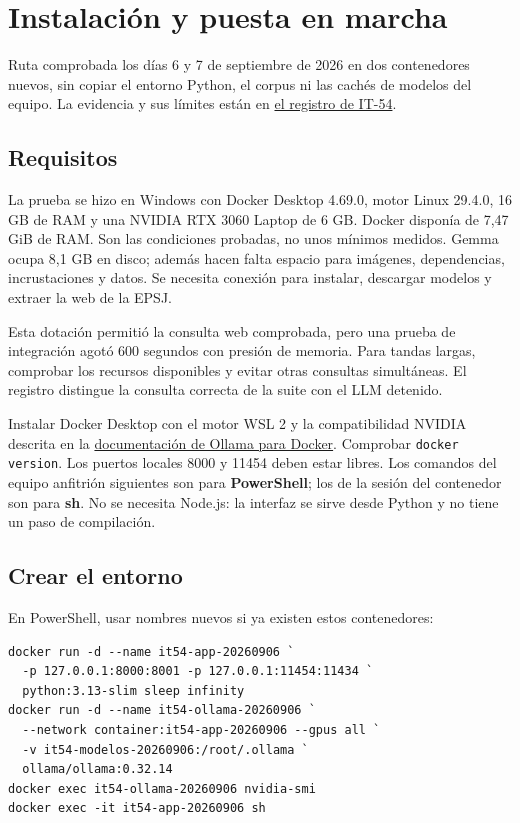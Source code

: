 \chapter{Instalación y puesta en marcha}\label{anexo:instalacion}

Ruta comprobada los días 6 y 7 de septiembre de 2026 en dos contenedores nuevos,
sin copiar el entorno Python, el corpus ni las cachés de modelos del equipo.
La evidencia y sus límites están en \href{https://github.com/samubp10/tfg-recomendador-uja/blob/main/docs/experimentos/it54-instalacion.md}{el registro de IT-54}.

\section{Requisitos}

La prueba se hizo en Windows con Docker Desktop 4.69.0, motor Linux 29.4.0,
16 GB de RAM y una NVIDIA RTX 3060 Laptop de 6 GB. Docker disponía de 7,47 GiB
de RAM. Son las condiciones probadas, no unos mínimos medidos. Gemma ocupa
8,1 GB en disco; además hacen falta espacio para imágenes, dependencias,
incrustaciones y datos. Se necesita conexión para instalar, descargar modelos
y extraer la web de la EPSJ.

Esta dotación permitió la consulta web comprobada, pero una prueba de
integración agotó 600 segundos con presión de memoria. Para tandas largas,
comprobar los recursos disponibles y evitar otras consultas simultáneas.
El registro distingue la consulta correcta de la suite con el LLM detenido.

Instalar Docker Desktop con el motor WSL 2 y la compatibilidad NVIDIA descrita
en la \href{https://docs.ollama.com/docker}{documentación de Ollama para Docker}.
Comprobar \texttt{docker version}. Los puertos locales 8000 y 11454 deben estar libres.
Los comandos del equipo anfitrión siguientes son para \textbf{PowerShell}; los de
la sesión del contenedor son para \textbf{sh}. No se necesita Node.js: la interfaz
se sirve desde Python y no tiene un paso de compilación.

\section{Crear el entorno}

En PowerShell, usar nombres nuevos si ya existen estos contenedores:

\begingroup\footnotesize\begin{verbatim}
docker run -d --name it54-app-20260906 `
  -p 127.0.0.1:8000:8001 -p 127.0.0.1:11454:11434 `
  python:3.13-slim sleep infinity
docker run -d --name it54-ollama-20260906 `
  --network container:it54-app-20260906 --gpus all `
  -v it54-modelos-20260906:/root/.ollama `
  ollama/ollama:0.32.14
docker exec it54-ollama-20260906 nvidia-smi
docker exec -it it54-app-20260906 sh
\end{verbatim}\endgroup

